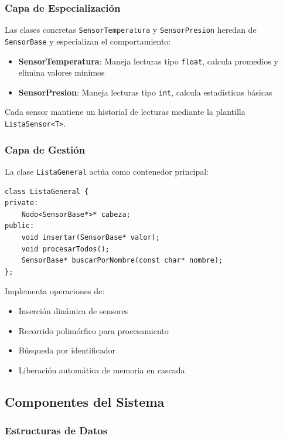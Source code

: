 \documentclass[conference]{IEEEtran}
\begin{document}
\subsubsection{Capa de Especialización}

Las clases concretas \texttt{SensorTemperatura} y \texttt{SensorPresion} heredan de \texttt{SensorBase} y especializan el comportamiento:

\begin{itemize}
    \item \textbf{SensorTemperatura}: Maneja lecturas tipo \texttt{float}, calcula promedios y elimina valores mínimos
    \item \textbf{SensorPresion}: Maneja lecturas tipo \texttt{int}, calcula estadísticas básicas
\end{itemize}

Cada sensor mantiene un historial de lecturas mediante la plantilla \texttt{ListaSensor<T>}.

\subsubsection{Capa de Gestión}

La clase \texttt{ListaGeneral} actúa como contenedor principal:

\vspace{0.3cm}
\begin{lstlisting}
class ListaGeneral {
private:
    Nodo<SensorBase*>* cabeza;
public:
    void insertar(SensorBase* valor);
    void procesarTodos();
    SensorBase* buscarPorNombre(const char* nombre);
};
\end{lstlisting}
\vspace{0.2cm}

Implementa operaciones de:
\begin{itemize}
    \item Inserción dinámica de sensores
    \item Recorrido polimórfico para procesamiento
    \item Búsqueda por identificador
    \item Liberación automática de memoria en cascada
\end{itemize}

\subsection{Componentes del Sistema}

\subsubsection{Estructuras de Datos}
\end{document}
